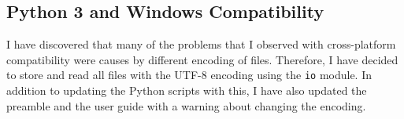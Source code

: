 \subsection{Python 3 and Windows Compatibility}
\label{task:20140903_jkn0}
I have discovered that many of the problems that I observed with cross-platform compatibility were causes by different encoding of files. Therefore, I have decided to store and read all files with the UTF-8 encoding using the {\tt io} module. In addition to updating the Python scripts with this, I have also updated the preamble and the user guide with a warning about changing the encoding.

